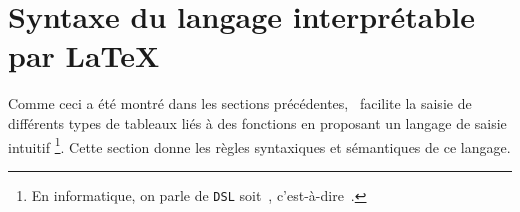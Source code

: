 \documentclass[10pt, a4paper]{article}
\begin{document}
\section{Syntaxe du langage interprétable par \LaTeX}

Comme ceci a été montré dans les sections précédentes, \thispack\ facilite la saisie de différents types de tableaux liés à des fonctions en proposant un langage de saisie intuitif
\footnote{
    En informatique, on parle de \texttt{DSL} soit \,, c'est-à-dire \,.
}.
Cette section donne les règles syntaxiques et sémantiques de ce langage.
\end{document}
